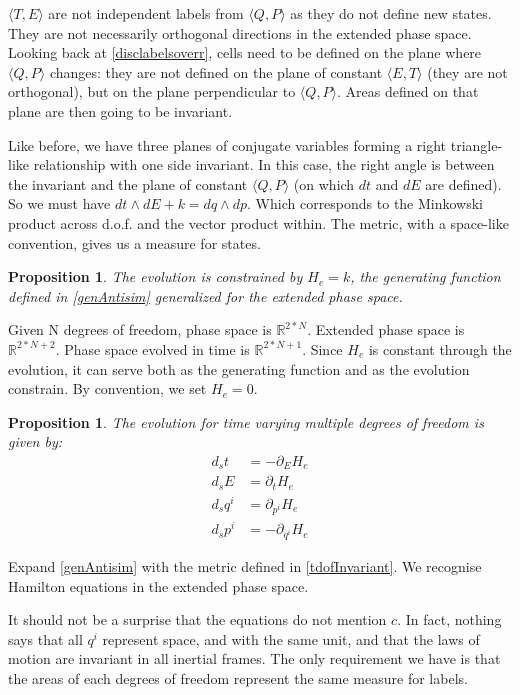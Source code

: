 \documentclass[twocolumn,floatfix,nofootinbib]{revtex4}   %
\theoremstyle{theorem}
\newtheorem{prop}[thm]{Proposition}
\theoremstyle{definition}
\begin{document}
$\langle T, E \rangle$ are not independent labels from $\langle Q, P \rangle$ as they do not define new states. They are not necessarily orthogonal directions in the extended phase space. Looking back at \ref{disclabelsoverr}, cells need to be defined on the plane where $\langle Q, P \rangle$ changes: they are not defined on the plane of constant $\langle E, T \rangle$ (they are not orthogonal), but on the plane perpendicular to $\langle Q, P \rangle$. Areas defined on that plane are then going to be invariant.

Like before, we have three planes of conjugate variables forming a right triangle-like relationship with one side invariant. In this case, the right angle is between the invariant and the plane of constant $\langle Q, P \rangle$ (on which $dt$ and $dE$ are defined). So we must have $dt \wedge dE + k = dq \wedge dp$. Which corresponds to the Minkowski product across d.o.f. and the vector product within. The metric, with a space-like convention, gives us a measure for states.

\begin{prop}\label{tdofConstrain}
The evolution is constrained by $H_{e}=k$, the generating function defined in \ref{genAntisim} generalized for the extended phase space.
\end{prop}

Given N degrees of freedom, phase space is $\mathbb{R}^{2*N}$. Extended phase space is $\mathbb{R}^{2*N + 2}$. Phase space evolved in time is $\mathbb{R}^{2*N + 1}$. Since $H_{e}$ is constant through the evolution, it can serve both as the generating function and as the evolution constrain. By convention, we set $H_{e}=0$.

\begin{prop}\label{tdofHam}
The evolution for time varying multiple degrees of freedom is given by:
\begin{align*}
d_{s}t &= - \partial_{E} H_{e} \\
d_{s}E &= \partial_{t} H_{e} \\
d_{s}q^i &= \partial_{p^i} H_{e} \\
d_{s}p^i &= - \partial_{q^i} H_{e}
\end{align*}
\end{prop}

Expand \ref{genAntisim} with the metric defined in \ref{tdofInvariant}. We recognise Hamilton equations in the extended phase space.

It should not be a surprise that the equations do not mention $c$. In fact, nothing says that all $q^i$ represent space, and with the same unit, and that the laws of motion are invariant in all inertial frames. The only requirement we have is that the areas of each degrees of freedom represent the same measure for labels.
\end{document}
